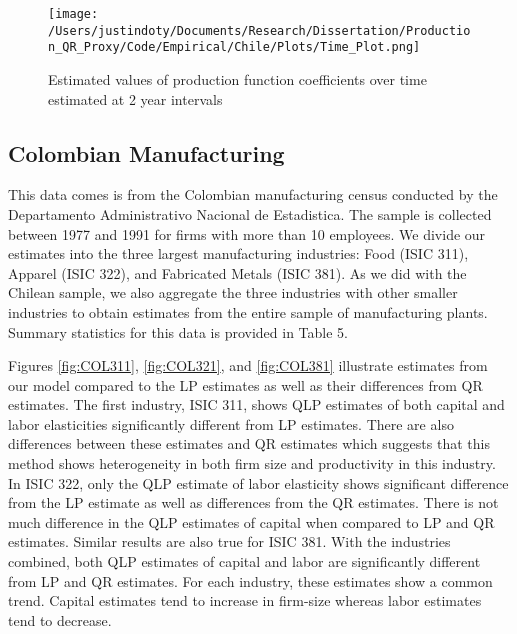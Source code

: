 \documentclass[11pt]{article}
\begin{document}
\begin{figure}[H]
\centering
\texttt{[image: /Users/justindoty/Documents/Research/Dissertation/Production\_QR\_Proxy/Code/Empirical/Chile/Plots/Time\_Plot.png]}
\caption{Estimated values of production function coefficients over time estimated at 2 year intervals}
\label{fig:CHLtimecoef}
\end{figure}



\subsection{Colombian Manufacturing}
This data comes is from the Colombian manufacturing census conducted by the Departamento Administrativo Nacional de Estadistica. The sample is collected between 1977 and 1991 for firms with more than 10 employees. We divide our estimates into the three largest manufacturing industries: Food (ISIC 311), Apparel (ISIC 322), and Fabricated Metals (ISIC 381). As we did with the Chilean sample, we also aggregate the three industries with other smaller industries to obtain estimates from the entire sample of manufacturing plants. Summary statistics for this data is provided in Table 5.



Figures \ref{fig:COL311}, \ref{fig:COL321}, and \ref{fig:COL381} illustrate estimates from our model compared to the LP estimates as well as their differences from QR estimates. The first industry, ISIC 311, shows QLP estimates of both capital and labor elasticities significantly different from LP estimates. There are also differences between these estimates and QR estimates which suggests that this method shows heterogeneity in both firm size and productivity in this industry. In ISIC 322, only the QLP estimate of labor elasticity shows significant difference from the LP estimate as well as differences from the QR estimates. There is not much difference in the QLP estimates of capital when compared to LP and QR estimates. Similar results are also true for ISIC 381. With the industries combined, both QLP estimates of capital and labor are significantly different from LP and QR estimates. For each industry, these estimates show a common trend. Capital estimates tend to increase in firm-size whereas labor estimates tend to decrease.
\end{document}
